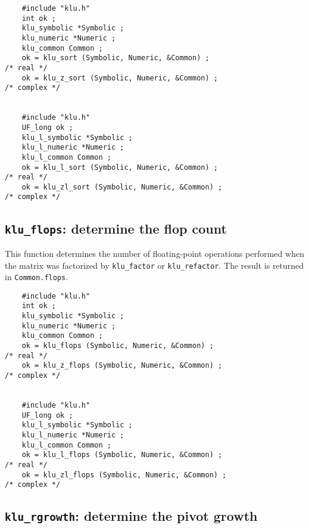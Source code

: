 \documentclass[11pt]{article}
\begin{document}
{\footnotesize
\begin{verbatim}
    #include "klu.h"
    int ok ;
    klu_symbolic *Symbolic ;
    klu_numeric *Numeric ;
    klu_common Common ;
    ok = klu_sort (Symbolic, Numeric, &Common) ;                                      /* real */
    ok = klu_z_sort (Symbolic, Numeric, &Common) ;                                    /* complex */


    #include "klu.h"
    UF_long ok ;
    klu_l_symbolic *Symbolic ;
    klu_l_numeric *Numeric ;
    klu_l_common Common ;
    ok = klu_l_sort (Symbolic, Numeric, &Common) ;                                    /* real */
    ok = klu_zl_sort (Symbolic, Numeric, &Common) ;                                   /* complex */
\end{verbatim}
}

\subsection{{\tt klu\_flops}: determine the flop count}

This function determines the number of floating-point operations performed
when the matrix was factorized by {\tt klu\_factor} or {\tt klu\_refactor}.
The result is returned in {\tt Common.flops}.


{\footnotesize
\begin{verbatim}
    #include "klu.h"
    int ok ;
    klu_symbolic *Symbolic ;
    klu_numeric *Numeric ;
    klu_common Common ;
    ok = klu_flops (Symbolic, Numeric, &Common) ;                                     /* real */
    ok = klu_z_flops (Symbolic, Numeric, &Common) ;                                   /* complex */


    #include "klu.h"
    UF_long ok ;
    klu_l_symbolic *Symbolic ;
    klu_l_numeric *Numeric ;
    klu_l_common Common ;
    ok = klu_l_flops (Symbolic, Numeric, &Common) ;                                   /* real */
    ok = klu_zl_flops (Symbolic, Numeric, &Common) ;                                  /* complex */
\end{verbatim}
}

\subsection{{\tt klu\_rgrowth}: determine the pivot growth}
\end{document}
